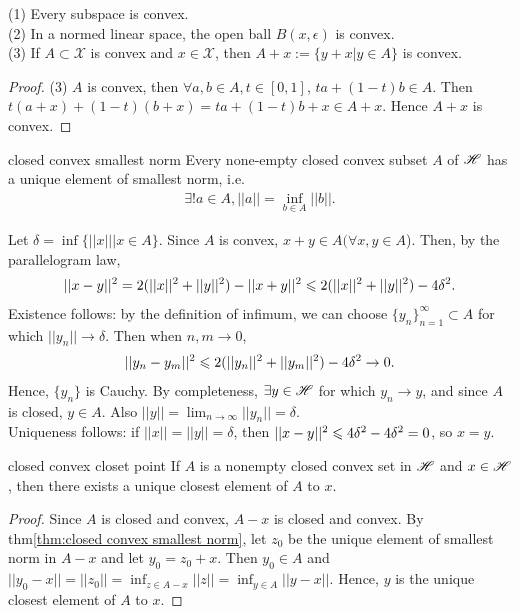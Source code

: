 \begin{proposition}{}{}
    (1) Every subspace is convex.\\
    (2) In a normed linear space, the open ball $B(x,\epsilon)$ is convex.\\
    (3) If $A\subset\mathscr{X}$ is convex and $x\in \mathscr{X}$, then $A+x:=\{y+x|y\in A\}$ is convex.
\end{proposition}
\begin{proof}
    (3) $A$ is convex, then $\forall a,b\in A, t\in[0,1]$, $ta+(1-t)b\in A$. Then $t(a+x)+(1-t)(b+x)=ta+(1-t)b+x\in A+x$.
    Hence $A+x$ is convex.
\end{proof}
\begin{theorem}{}{closed convex smallest norm}
    Every none-empty closed convex subset $A$ of $\mathscr{H}$ has a unique element of smallest norm, i.e.
    \begin{align*}
        \exists ! a\in A, ||a|| = \inf_{b\in A}||b||.
    \end{align*}
\end{theorem}

\begin{proofsolution}
    Let $\delta=\inf\{||x|||x\in A\}$. Since $A$ is convex, $x+y\in A(\forall x,y\in A$). Then, by the parallelogram law,
    \begin{align*}
        ||x-y||^2=2(||x||^2+||y||^2)-||x+y||^2\leqslant 2(||x||^2+||y||^2)-4\delta^2.
    \end{align*}
    Existence follows: by the definition of infimum, we can choose $\{y_n\}_{n=1}^{\infty}\subset A$ for which $||y_n||\rightarrow \delta$. 
    Then when $n,m\rightarrow 0$,
    \begin{align*}
        ||y_n-y_m||^2\leqslant 2(||y_n||^2+||y_m||^2)-4\delta^2\rightarrow 0.
    \end{align*}
    Hence, $\{y_n\}$ is Cauchy. By completeness, $\exists y\in \mathscr{H}$ for which $y_n\rightarrow y$, and since $A$ is closed, $y\in A$. 
    Also $||y||=\lim_{n\rightarrow \infty} ||y_n||=\delta$. \\
    Uniqueness follows: if $||x||=||y||=\delta$, then $||x-y||^2\leqslant 4\delta^2-4\delta^2=0$, so $x=y$.
\end{proofsolution}

\begin{corollary}{}{closed convex closet point}
    If $A$ is a nonempty closed convex set in $\mathscr{H}$ and $x\in \mathscr{H}$, then there exists a unique closest element of $A$ to $x$.
\end{corollary}
\begin{proof}
    Since $A$ is closed and convex, $A-x$ is closed and convex. By thm\ref{thm:closed convex smallest norm}, let $z_0$ be the unique element of smallest norm in $A-x$
    and let $y_0=z_0+x$. Then $y_0\in A$ and $||y_0-x||=||z_0||=\inf_{z\in A-x}||z|| = \inf_{y\in A} ||y-x||$. 
    Hence, $y$ is the unique closest element of $A$ to $x$. 
\end{proof}

